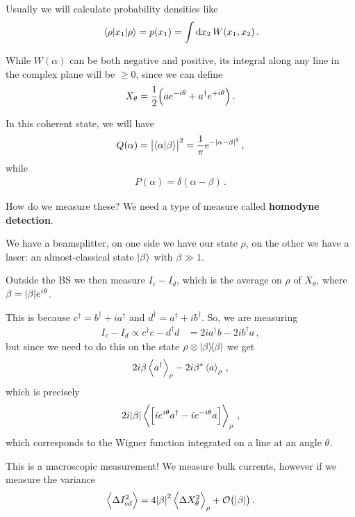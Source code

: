 \documentclass[main.tex]{subfiles}
\begin{document}
Usually we will calculate probability densities like 
%
\begin{align}
\ev{x_1}{\rho } = p(x_1 ) = \int \dd{x_2 } W(x_1 , x_2 )
\,.
\end{align}

While \(W(\alpha )\) can be both negative and positive, its integral along any line in the complex plane will be \(\geq 0\), since we can define 
%
\begin{align}
X_{\theta } = \frac{1}{2} \qty(a e^{-i \theta } + a ^\dag e^{+i \theta })
\,.
\end{align}

In this coherent state, we will have 
%
\begin{align}
Q(\alpha ) = \abs{ \braket{\alpha }{\beta }}^2 = \frac{1}{\pi } e^{- \abs{\alpha - \beta }^2}
\,,
\end{align}
%
while 
%
\begin{align}
P(\alpha ) = \delta (\alpha - \beta )
\,.
\end{align}

How do we measure these? We need a type of measure called \textbf{homodyne detection}.

We have a beamsplitter, on one side we have our state \(\rho \), on the other we have a laser: an almost-classical state  \(\ket{\beta }\) with \(\beta \gg 1\). 

Outside the BS we then measure \(I_c - I_d\), which is the average on \(\rho \) of \(X_{\theta }\), where \(\beta = \abs{\beta } e^{i \theta }\). 

This is because \(c ^\dag = b ^\dag + i a ^\dag\) and \(d ^\dag = a ^\dag + i b ^\dag\). So, we are measuring 
%
\begin{align}
I_c - I_d \propto c ^\dag c - d ^\dag d &= 2 i a ^\dag b - 2 i b ^\dag a
\,,
\end{align}
%
but since we need to do this on the state \(\rho \otimes \dyad{\beta }\) we get 
%
\begin{align}
2 i \beta \expval{a ^\dag}_{\rho } - 2 i \beta^{*} \expval{a}_{\rho } 
\,,
\end{align}
%
which is precisely 
%
\begin{align}
2 i \abs{\beta } \expval{\qty[i e^{i \theta } a ^\dag - i e^{-i \theta }a]}_{\rho }
\,,
\end{align}
%
which corresponds to the Wigner function integrated on a line at an angle \(\theta \). 

This is a macroscopic measurement! We measure bulk currents, however if we measure the variance 
%
\begin{align}
\expval{\Delta I^2_{cd}} = 4 \abs{\beta }^2 \expval{\Delta X_{\theta }^2}_{\rho } + \order{ \abs{\beta} }
\,.
\end{align}
\end{document}
